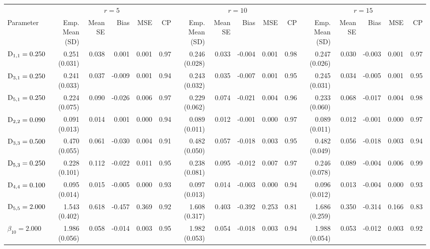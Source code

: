 \begin{landscape}
\begin{table}[ht]
\end{table}
\vfill
\lscapepageno
\clearpage
\thispagestyle{empty}
\vspace*{3.5em}
\begin{table}[ht]
\centering
{}
\captionsetup{font=scriptsize}
\begingroup\scriptsize
\begin{tabular}{l|rrrrr:rrrrr:rrrrr}
  &  &  & \\ 
  Parameter & Emp. Mean (SD) & Mean SE & Bias & MSE & CP & Emp. Mean (SD) & Mean SE & Bias & MSE & CP & Emp. Mean (SD) & Mean SE & Bias & MSE & CP \\ 
  \hline
  $\mathrm{D}_{1,1}= 0.250$ &  0.251 (0.031) & 0.038 &  0.001 & 0.001 & 0.97 &  0.246 (0.028) & 0.033 & -0.004 & 0.001 & 0.98 &  0.247 (0.026) & 0.030 & -0.003 & 0.001 & 0.97 \\ 
  $\mathrm{D}_{3,1}= 0.250$ &  0.241 (0.033) & 0.037 & -0.009 & 0.001 & 0.94 &  0.243 (0.032) & 0.035 & -0.007 & 0.001 & 0.95 &  0.245 (0.031) & 0.034 & -0.005 & 0.001 & 0.95 \\ 
  $\mathrm{D}_{5,1}= 0.250$ &  0.224 (0.075) & 0.090 & -0.026 & 0.006 & 0.97 &  0.229 (0.062) & 0.074 & -0.021 & 0.004 & 0.96 &  0.233 (0.060) & 0.068 & -0.017 & 0.004 & 0.98 \\ 
  $\mathrm{D}_{2,2}= 0.090$ &  0.091 (0.013) & 0.014 &  0.001 & 0.000 & 0.94 &  0.089 (0.011) & 0.012 & -0.001 & 0.000 & 0.97 &  0.089 (0.011) & 0.012 & -0.001 & 0.000 & 0.97 \\ 
  $\mathrm{D}_{3,3}= 0.500$ &  0.470 (0.055) & 0.061 & -0.030 & 0.004 & 0.91 &  0.482 (0.050) & 0.057 & -0.018 & 0.003 & 0.95 &  0.482 (0.049) & 0.056 & -0.018 & 0.003 & 0.94 \\ 
  $\mathrm{D}_{5,3}= 0.250$ &  0.228 (0.101) & 0.112 & -0.022 & 0.011 & 0.95 &  0.238 (0.081) & 0.095 & -0.012 & 0.007 & 0.97 &  0.246 (0.078) & 0.089 & -0.004 & 0.006 & 0.99 \\ 
  $\mathrm{D}_{4,4}= 0.100$ &  0.095 (0.014) & 0.015 & -0.005 & 0.000 & 0.93 &  0.097 (0.013) & 0.014 & -0.003 & 0.000 & 0.94 &  0.096 (0.012) & 0.013 & -0.004 & 0.000 & 0.93 \\ 
  $\mathrm{D}_{5,5}= 2.000$ &  1.543 (0.402) & 0.618 & -0.457 & 0.369 & 0.92 &  1.608 (0.317) & 0.403 & -0.392 & 0.253 & 0.81 &  1.686 (0.259) & 0.350 & -0.314 & 0.166 & 0.83 \\ 
  $\beta_{10}= 2.000$ &  1.986 (0.056) & 0.058 & -0.014 & 0.003 & 0.95 &  1.982 (0.053) & 0.054 & -0.018 & 0.003 & 0.94 &  1.988 (0.054) & 0.053 & -0.012 & 0.003 & 0.92 \\ 

\end{tabular}
\end{table}
\end{landscape}
